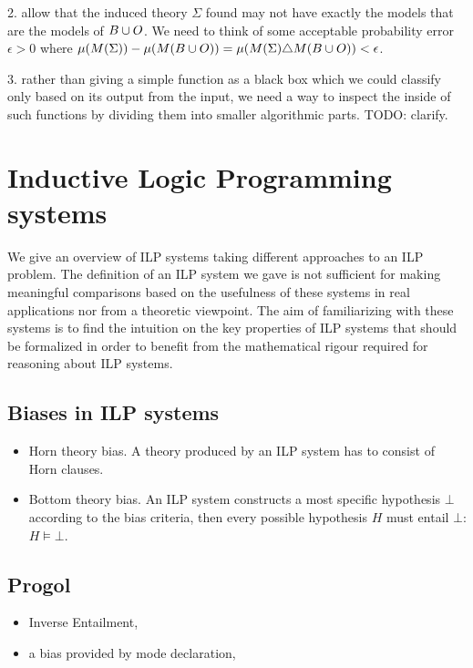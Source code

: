 2. allow that the induced theory $\Sigma$ found may not have exactly the models that are the models of $B \cup O$. We need to think of some acceptable probability error $\epsilon>0$ where $\mu(M(\Sigma))-\mu(M(B \cup O)) = \mu(M(\Sigma)  \triangle  M(B \cup O)) < \epsilon$.

3. rather than giving a simple function as a black box which we could classify only based on its output from the input, we need a way to inspect the inside of such functions by dividing them into smaller algorithmic parts.
TODO: clarify.

\section{Inductive Logic Programming systems}
We give an overview of ILP systems taking different approaches to an ILP problem. The definition of an ILP system we gave is not sufficient for making meaningful comparisons based on the usefulness of these systems in real applications nor from a theoretic viewpoint. The aim of familiarizing with these systems is to find the intuition on the key properties of ILP systems that should be formalized in order to benefit from the mathematical rigour required for reasoning about ILP systems.

\subsection{Biases in ILP systems}
\begin{itemize}
\item Horn theory bias. A theory produced by an ILP system has to consist of Horn clauses.
\item Bottom theory bias. An ILP system constructs a most specific hypothesis $\bot$ according to the bias criteria, then every possible hypothesis $H$ must entail $\bot$: $H \models \bot$.

\end{itemize}
\subsection{Progol}
\begin{itemize}
\item Inverse Entailment,
\item a bias provided by mode declaration,

\end{itemize}

